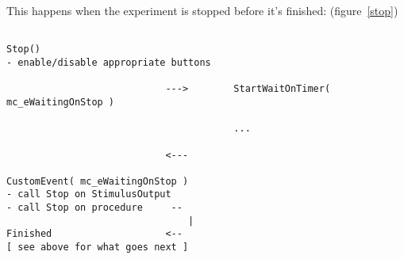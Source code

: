 \documentclass[a4paper,12pt]{article}
\begin{document}
\begin{landscape}
This happens when the experiment is stopped before it's finished: (figure~\ref{stop})

\begin{verbatim}

Stop()
- enable/disable appropriate buttons

                            --->        StartWaitOnTimer( mc_eWaitingOnStop )

                                        ...

                            <---

CustomEvent( mc_eWaitingOnStop )
- call Stop on StimulusOutput
- call Stop on procedure     --
                                |
Finished                    <--
[ see above for what goes next ]

\end{verbatim}
\end{landscape}



%
%
\end{document}
